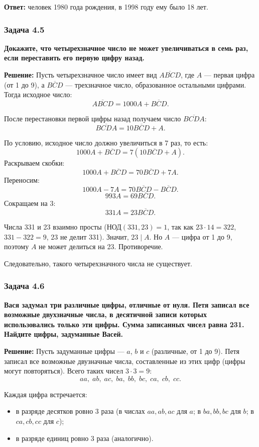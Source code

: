 \documentclass[12pt, a4paper]{article}
\begin{document}
\textbf{Ответ:} человек 1980 года рождения, в 1998 году ему было 18 лет.

\subsubsection*{Задача 4.5}
\textbf{Докажите, что четырехзначное число не может увеличиваться в семь раз, если переставить его первую цифру назад.}

\textbf{Решение:}
Пусть четырехзначное число имеет вид $\overline{ABCD}$, где $A$ — первая цифра (от 1 до 9), а $\overline{BCD}$ — трехзначное число, образованное остальными цифрами. Тогда исходное число:
\[
\overline{ABCD} = 1000A + \overline{BCD}.
\]

После перестановки первой цифры назад получаем число $\overline{BCDA}$:
\[
\overline{BCDA} = 10\overline{BCD} + A.
\]

По условию, исходное число должно увеличиться в 7 раз, то есть:
\[
1000A + \overline{BCD} = 7(10\overline{BCD} + A).
\]
Раскрываем скобки:
\[
1000A + \overline{BCD} = 70\overline{BCD} + 7A.
\]
Переносим:
\[
1000A - 7A = 70\overline{BCD} - \overline{BCD}.
\]
\[
993A = 69\overline{BCD}.
\]
Сокращаем на 3:
\[
331A = 23\overline{BCD}.
\]

Числа 331 и 23 взаимно просты ($\text{НОД}(331, 23) = 1$, так как $23 \cdot 14 = 322$, $331 - 322 = 9$, $23$ не делит 331). Значит, $23 \mid A$. Но $A$ — цифра от 1 до 9, поэтому $A$ не может делиться на 23. Противоречие.

Следовательно, такого четырехзначного числа не существует.

\subsubsection*{Задача 4.6}
\textbf{Вася задумал три различные цифры, отличные от нуля. Петя записал все возможные двухзначные числа, в десятичной записи которых использовались только эти цифры. Сумма записанных чисел равна 231. Найдите цифры, задуманные Васей.}

\textbf{Решение:}
Пусть задуманные цифры — $a$, $b$ и $c$ (различные, от 1 до 9). Петя записал все возможные двузначные числа, составленные из этих цифр (цифры могут повторяться). Всего таких чисел $3 \cdot 3 = 9$:
\[
aa,\; ab,\; ac,\; ba,\; bb,\; bc,\; ca,\; cb,\; cc.
\]

Каждая цифра встречается:
\begin{itemize}
    \item в разряде десятков ровно 3 раза (в числах $aa, ab, ac$ для $a$; в $ba, bb, bc$ для $b$; в $ca, cb, cc$ для $c$);
    \item в разряде единиц ровно 3 раза (аналогично).
\end{itemize}
\end{document}
